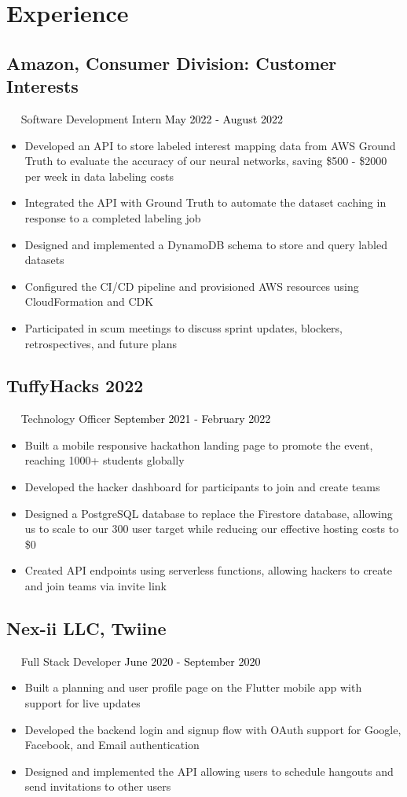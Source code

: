 \documentclass{article}
\newcommand{\resumesection}[3]{
    \subsection*{#1}
    \ 
    \ 
    \small
    \textcolor{csufgrey}{#2}
    \normalsize
    \hfill
    \textcolor{black}{#3}
    \normalsize
}
\begin{document}
\section*{Experience}
\resumesection{Amazon, Consumer Division: Customer Interests}{Software Development Intern}{May 2022 - August 2022}
\begin{itemize}
    \item Developed an API to store labeled interest mapping data from AWS Ground Truth to evaluate the accuracy of our neural networks, saving \$500 - \$2000 per week in data labeling costs
    \item Integrated the API with Ground Truth to automate the dataset caching in response to a completed labeling job
    \item Designed and implemented a DynamoDB schema to store and query labled datasets
    \item Configured the CI/CD pipeline and provisioned AWS resources using CloudFormation and CDK 
    \item Participated in scum meetings to discuss sprint updates, blockers, retrospectives, and future plans
\end{itemize}
\resumesection{TuffyHacks 2022}{Technology Officer}{September 2021 - February 2022}
\begin{itemize}
    \item Built a mobile responsive hackathon landing page to promote the event, reaching 1000+ students globally 
    \item Developed the hacker dashboard for participants to join and create teams
    \item Designed a PostgreSQL database to replace the Firestore database, allowing us to scale to our 300 user target while reducing our effective hosting costs to \$0
    \item Created API endpoints using serverless functions, allowing hackers to create and join teams via invite link
\end{itemize}
\resumesection{Nex-ii LLC, Twiine}{Full Stack Developer}{June 2020 - September 2020}
\begin{itemize}
    \item Built a planning and user profile page on the Flutter mobile app with support for live updates
    \item Developed the backend login and signup flow with OAuth support for Google, Facebook, and Email authentication
    \item Designed and implemented the API allowing users to schedule hangouts and send invitations to other users
\end{itemize}
\end{document}
